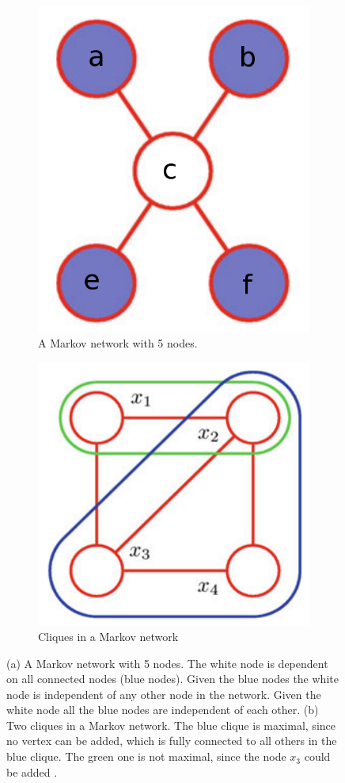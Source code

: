 \begin{figure}
	\centering
	\begin{subfigure}[t]{.5\textwidth}
  		\centering
  		\includegraphics[width=.5\linewidth]{imgs/markovnet1.png}
  		\caption{A Markov network with 5 nodes.}
  		\label{fig:markovnet1}
	\end{subfigure}%
	\begin{subfigure}[t]{.5\textwidth}
  		\centering
  		\includegraphics[width=.5\linewidth]{imgs/markovnet2.png}
  		\caption{Cliques in a Markov network}
  		\label{fig:markovnet2}
	\end{subfigure}
	\caption[A Markov network with 5 nodes.]{(a) A Markov network with 5 nodes. The white node is dependent on all connected nodes (blue nodes). Given the blue nodes the white node is independent of any other node in the network. Given the white node all the blue nodes are independent of each other. (b) Two cliques in a Markov network. The blue clique is maximal, since no vertex can be added, which is fully connected to all others in the blue clique. The green one is not maximal, since the node $x_3$ could be added \cite{bishop2013pattern}.}
	\label{fig:markovnet}
\end{figure}


